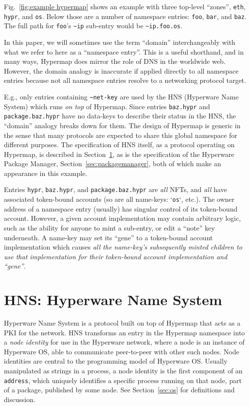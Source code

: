 \documentclass[runningheads]{llncs}
\begin{document}
Fig.~\ref{fig:example hypermap} shows an example with three top-level ``zones'', \verb|eth|, \verb|hypr|, and \verb|os|.
Below those are a number of namespace entries: \verb|foo|, \verb|bar|, and \verb|baz|.
The full path for \verb|foo|'s \verb|~ip| sub-entry would be \verb|~ip.foo.os|.

In this paper, we will sometimes use the term ``domain'' interchangeably with what we refer to here as a ``namespace entry''.
This is a useful shorthand, and in many ways, Hypermap does mirror the role of DNS in the worldwide web.
However, the domain analogy is inaccurate if applied directly to all namespace entries because not all namespace entries resolve to a networking protocol target.

E.g., only entries containing \verb|~net-key| are used by the HNS (Hyperware Name System) which runs \textit{on top} of Hypermap.
Since entries \verb|baz.hypr| and \verb|package.baz.hypr| have no data-keys to describe their status in the HNS, the ``domain'' analogy breaks down for them.
The design of Hypermap is generic in the sense that many protocols are expected to share this global namespace for different purposes.
The specification of HNS itself, as a protocol operating on Hypermap, is described in Section~\ref{sec:hns}, as is the specification of the Hyperware Package Manager, Section~\ref{sec:packagemanager}, both of which make an appearance in this example.

Entries \verb|hypr|, \verb|baz.hypr|, and \verb|package.baz.hypr| are \textit{all} NFTs, and \textit{all} have associated token-bound accounts (so are all name-keys: `\verb|os|`, etc.).
The owner address of a namespace entry (usually) has singular control of its token-bound account.
However, a given account implementation may contain arbitrary logic, such as the ability for anyone to mint a sub-entry, or edit a ``note'' key underneath.
A name-key may set its ``gene'' to a token-bound account implementation which causes \textit{all the name-key's subsequently minted children to use that implementation for their token-bound account implementation and ``gene''}.

\section{HNS: Hyperware Name System}
\label{sec:hns}

Hyperware Name System is a protocol built on top of Hypermap that acts as a PKI for the network.
HNS transforms an entry in the Hypermap namespace into a \textit{node identity} for use in the Hyperware network, where a node is an instance of Hyperware OS, able to communicate peer-to-peer with other such nodes.
Node identities are central to the programming model of Hyperware OS.
Usually manipulated as strings in a process, a node identity is the first component of an \verb|address|, which uniquely identifies a specific process running on that node, part of a package, published by some node. See Section~\ref{sec:os} for definitions and discussion.
\end{document}
